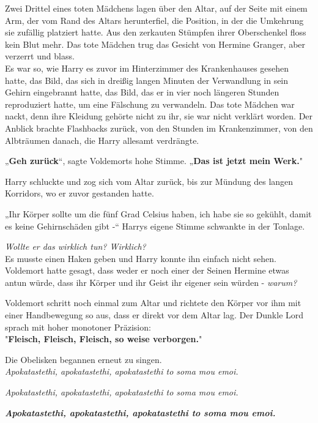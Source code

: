 {Zwei Drittel eines toten Mädchens lagen über den Altar, auf der Seite mit einem Arm, der vom Rand des Altars herunterfiel, die Position, in der die Umkehrung sie zufällig platziert hatte. Aus den zerkauten Stümpfen ihrer Oberschenkel floss kein Blut mehr. Das tote Mädchen trug das Gesicht von Hermine Granger, aber verzerrt und blass.\\ Es war so, wie Harry es zuvor im Hinterzimmer des Krankenhauses gesehen hatte, das Bild, das sich in dreißig langen Minuten der Verwandlung in sein Gehirn eingebrannt hatte, das Bild, das er in vier noch längeren Stunden reproduziert hatte, um eine Fälschung zu verwandeln. Das tote Mädchen war nackt, denn ihre Kleidung gehörte nicht zu ihr, sie war nicht verklärt worden. Der Anblick brachte Flashbacks zurück, von den Stunden im Krankenzimmer, von den Albträumen danach, die Harry allesamt verdrängte.

„\textbf{Geh zurück}“, sagte Voldemorts hohe Stimme. „\textbf{Das ist jetzt mein Werk.}"

Harry schluckte und zog sich vom Altar zurück, bis zur Mündung des langen Korridors, wo er zuvor gestanden hatte.

„Ihr Körper sollte um die fünf Grad Celsius haben, ich habe sie so gekühlt, damit es keine Gehirnschäden gibt -“ Harrys eigene Stimme schwankte in der Tonlage.

\emph{Wollte er das wirklich tun? Wirklich?}\\ Es musste einen Haken geben und Harry konnte ihn einfach nicht sehen. Voldemort hatte gesagt, dass weder er noch einer der Seinen Hermine etwas antun würde, dass ihr Körper und ihr Geist ihr eigener sein würden - \emph{warum?}

Voldemort schritt noch einmal zum Altar und richtete den Körper vor ihm mit einer Handbewegung so aus, dass er direkt vor dem Altar lag. Der Dunkle Lord sprach mit hoher monotoner Präzision:\\ "\textbf{Fleisch, Fleisch, Fleisch, so weise verborgen.}"

Die Obelisken begannen erneut zu singen.\\

\hfill\break \emph{Apokatastethi, apokatastethi, apokatastethi to soma mou emoi.}

\hfill\break

\emph{Apokatastethi, apokatastethi, apokatastethi to soma mou emoi.}

\hfill\break

\textbf{\emph{Apokatastethi, apokatastethi, apokatastethi to soma mou emoi.}}

}
